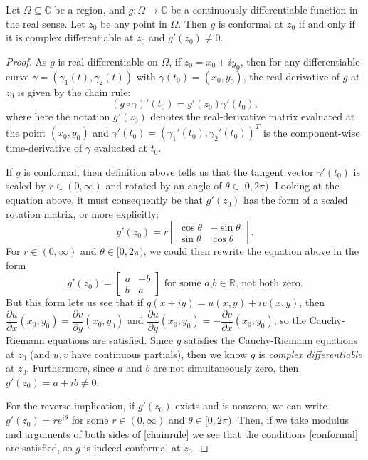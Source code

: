 \begin{theorem}
    Let $\Omega\subseteq \mathbb{C}$ be a region, and $g:\Omega\to\mathbb{C}$ be a continuously differentiable function in the real sense. Let $z_0$ be any point in $\Omega$. Then $g$ is conformal at $z_0$ if and only if it is complex differentiable at $z_0$ and $g'(z_0)\neq 0$. \begin{proof}
        As $g$ is real-differentiable on $\Omega$, if $z_0=x_0+iy_0$, then for any differentiable curve $\gamma=(\gamma_1(t),\gamma_2(t))$ with $\gamma(t_0)=(x_0,y_0)$, the real-derivative of $g$ at $z_0$ is given by the chain rule: \begin{equation}
    (g\circ\gamma)'(t_0)=g'(z_0)\gamma'(t_0),\label{chainrule}
\end{equation}where here the notation $g'(z_0)$ denotes the real-derivative matrix evaluated at the point $(x_0,y_0)$ and $\gamma'(t_0)=(\gamma_1'(t_0),\gamma_2'(t_0))^T$ is the component-wise time-derivative of $\gamma$ evaluated at $t_0$. 

If $g$ is conformal, then definition above tells us that the tangent vector $\gamma'(t_0)$ is scaled by $r\in(0,\infty)$ and rotated by an angle of $\theta\in[0,2\pi)$. Looking at the equation above, it must consequently be that $g'(z_0)$ has the form of a scaled rotation matrix, or more explicitly:\begin{equation}g'(z_0)=r\begin{bmatrix}\cos\theta&-\sin\theta\\\sin\theta&\cos\theta\end{bmatrix}.\end{equation}For $r\in(0,\infty)$ and $\theta\in[0,2\pi)$, we could then rewrite the equation above in the form \begin{equation}g'(z_0)=\begin{bmatrix}a&-b\\b&a\end{bmatrix}\text{ for some $a$,$b\in\mathbb{R}$, not both zero.}\end{equation} But this form lets us see that if $g(x+iy)=u(x,y)+iv(x,y)$, then $\dfrac{\partial u}{\partial x}(x_0,y_0)=\dfrac{\partial v}{\partial y}(x_0,y_0)$ and $\dfrac{\partial u}{\partial y}(x_0,y_0)=-\dfrac{\partial v}{\partial x}(x_0,y_0)$, so the Cauchy-Riemann equations are satisfied. Since $g$ satisfies the Cauchy-Riemann equations at $z_0$ (and $u,v$ have continuous partials), then we know $g$ is \textit{complex differentiable} at $z_0$. Furthermore, since $a$ and $b$ are not simultaneously zero, then $g'(z_0)=a+ib\neq 0$. 

For the reverse implication, if $g'(z_0)$ exists and is nonzero, we can write $g'(z_0)=re^{i\theta}$ for some $r\in(0,\infty)$ and $\theta\in[0,2\pi)$. Then, if we take modulus and arguments of both sides of \eqref{chainrule} we see that the conditions \eqref{conformal} are satisfied, so $g$ is indeed conformal at $z_0$.
    \end{proof}
\end{theorem}


